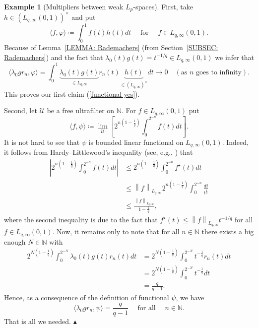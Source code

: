 \documentclass[11pt]{amsart}
\theoremstyle{definition}
\theoremstyle{definition}
\theoremstyle{definition}
\theoremstyle{definition}
\theoremstyle{definition}
\theoremstyle{definition}
\theoremstyle{definition}
\newtheorem{example}[theorem]{Example}
\theoremstyle{definition}
\numberwithin{equation}{section}
\numberwithin{equation}{section}
\numberwithin{equation}{section}
\theoremstyle{definition}
\theoremstyle{definition}
\theoremstyle{definition}
\theoremstyle{definition}
\theoremstyle{definition}
\theoremstyle{definition}
\newcommand{\norm}[1]{\left\lVert#1\right\rVert}
\newcommand{\abs}[1]{\left\lvert#1\right\rvert}
\newcommand\xqed[1]{%
	\leavevmode\unskip\penalty9999 \hbox{}\nobreak\hfill
	\quad\hbox{#1}}
\newcommand\demo{\xqed{{\Large $\blacktriangle$}}}
\begin{document}
\begin{example}[Multipliers between weak $L_p$-spaces]
	First, take $h \in (L_{q,\infty}(0,1))^{\times}$ and put
	\begin{equation*}
		\langle f, \varphi \rangle \coloneqq \int_0^1 f(t)h(t)dt \quad \text{ for } \quad f \in L_{q,\infty}(0,1).
	\end{equation*}
	Because of Lemma~\ref{LEMMA: Rademachers} (from Section~\ref{SUBSEC: Rademachers}) and the fact that $\lambda_0(t)g(t) = t^{-1/q} \in L_{q,\infty}(0,1)$ we infer that
	\begin{equation*}
		\langle \lambda_0 g r_n, \varphi \rangle = \int_0^1 \underbrace{\lambda_0(t)g(t)}_{\in L_{q,\infty}} r_n(t) \underbrace{h(t)}_{\in (L_{q,\infty})^{\times}}dt
			\rightarrow 0 \quad (\text{as $n$ goes to infinity}).
	\end{equation*}
	This proves our first claim (\ref{functional yes}).

	Second, let $\mathscr{U}$ be a free ultrafilter on $\mathbb{N}$. For $f \in L_{q,\infty}(0,1)$ put
	\begin{equation*}
		\langle f, \psi \rangle \coloneqq \lim\limits_{\mathscr{U}} \left[ 2^{n\left( 1-\frac{1}{q} \right)} \int_0^{2^{-n}} f(t)dt \right].
	\end{equation*}
	It is not hard to see that $\psi$ is bounded linear functional on $L_{q,\infty}(0,1)$. Indeed, it follows from Hardy--Littlewood's inequality
	(see, e.g., \cite[Theorem~2.2, p.~44]{BS88}) that
	\begin{align*}
		\abs{2^{n\left( 1-\frac{1}{q} \right)} \int_0^{2^{-n}} f(t)dt}
			& \leqslant 2^{n\left( 1-\frac{1}{q} \right)} \int_0^{2^{-n}} f^{\star}(t)dt \\
			& \leqslant \norm{f}_{L_{q,\infty}} 2^{n\left( 1-\frac{1}{q} \right)} \int_0^{2^{-n}} \frac{dt}{t^{\frac{1}{q}}} \\
			& \leqslant \frac{\norm{f}_{L_{q,\infty}}}{1 - \frac{1}{q}},
	\end{align*}
	where the second inequality is due to the fact that $f^{\star}(t) \leqslant \norm{f}_{L_{q,\infty}} t^{-1/q}$ for all $f \in L_{q,\infty}(0,1)$.
	Now, it remains only to note that for all $n \in \mathbb{N}$ there exists a big enough $N \in \mathbb{N}$ with
	\begin{align*}
		2^{N\left( 1-\frac{1}{q} \right)} \int_0^{2^{-N}} \lambda_0(t)g(t)r_n(t)dt
			& = 2^{N\left( 1-\frac{1}{q} \right)} \int_0^{2^{-N}} t^{-\frac{1}{q}}r_n(t)dt \\
			& = 2^{N\left( 1-\frac{1}{q} \right)} \int_0^{2^{-N}} t^{-\frac{1}{q}}dt \\
			& = \frac{q}{q-1}.
	\end{align*}
	Hence, as a consequence of the definition of functional $\psi$, we have
	\begin{equation*}
		\langle \lambda_0 g r_n, \psi \rangle = \frac{q}{q-1} \quad \text{ for all } \quad n \in \mathbb{N}.
	\end{equation*}
	That is all we needed.
	\demo
\end{example}
\end{document}
